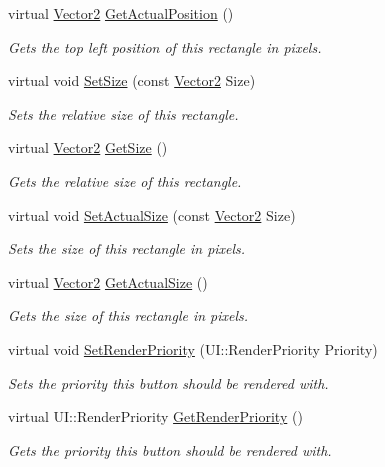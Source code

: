 \begin{DoxyCompactItemize}
virtual \hyperlink{classphys_1_1Vector2}{Vector2} \hyperlink{classphys_1_1UI_1_1Rectangle_a976f977ee23e805b4a193fc0f9e8392f}{GetActualPosition} ()
\begin{DoxyCompactList}\small\item\em Gets the top left position of this rectangle in pixels. \item\end{DoxyCompactList}\item 
virtual void \hyperlink{classphys_1_1UI_1_1Rectangle_a7132423dde2e053b288cdff3e57e5147}{SetSize} (const \hyperlink{classphys_1_1Vector2}{Vector2} Size)
\begin{DoxyCompactList}\small\item\em Sets the relative size of this rectangle. \item\end{DoxyCompactList}\item 
virtual \hyperlink{classphys_1_1Vector2}{Vector2} \hyperlink{classphys_1_1UI_1_1Rectangle_a5f54debc5c435cda9505b40ce82f4f24}{GetSize} ()
\begin{DoxyCompactList}\small\item\em Gets the relative size of this rectangle. \item\end{DoxyCompactList}\item 
virtual void \hyperlink{classphys_1_1UI_1_1Rectangle_a554e24caf820a94d2710ed94303d899a}{SetActualSize} (const \hyperlink{classphys_1_1Vector2}{Vector2} Size)
\begin{DoxyCompactList}\small\item\em Sets the size of this rectangle in pixels. \item\end{DoxyCompactList}\item 
virtual \hyperlink{classphys_1_1Vector2}{Vector2} \hyperlink{classphys_1_1UI_1_1Rectangle_ae29501765e3af7eac37d5ac581e77b24}{GetActualSize} ()
\begin{DoxyCompactList}\small\item\em Gets the size of this rectangle in pixels. \item\end{DoxyCompactList}\item 
virtual void \hyperlink{classphys_1_1UI_1_1Rectangle_a59b281da90012acc64425389f2aea806}{SetRenderPriority} (UI::RenderPriority Priority)
\begin{DoxyCompactList}\small\item\em Sets the priority this button should be rendered with. \item\end{DoxyCompactList}\item 
virtual UI::RenderPriority \hyperlink{classphys_1_1UI_1_1Rectangle_a8445b7d0dcb2c92f29aeadac305af420}{GetRenderPriority} ()
\begin{DoxyCompactList}\small\item\em Gets the priority this button should be rendered with. \item\end{DoxyCompactList}\end{DoxyCompactItemize}
